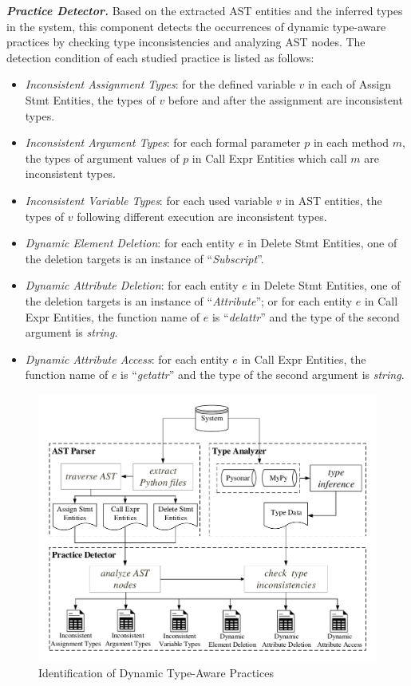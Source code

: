 \noindent\textbf{\emph{Practice Detector.}} Based on the extracted AST entities and the inferred types in the system, this component detects the occurrences of dynamic type-aware practices by checking type inconsistencies and analyzing AST nodes. The detection condition of each studied practice is listed as follows:
\begin{itemize}
	\item 
	\emph{Inconsistent Assignment Types}: for the defined variable $v$ in each of Assign Stmt Entities,  the types of $v$ before and after the assignment are inconsistent types.
	\item 
	\emph{Inconsistent Argument Types}: for each formal parameter $p$ in each method $m$, the types of argument values of $p$  in Call Expr Entities which call $m$ are inconsistent types.
	\item 
	\emph{Inconsistent Variable Types}: for each used variable $v$ in AST entities, the types of $v$ following different execution are inconsistent types.
	\item 
	\emph{Dynamic Element Deletion}: for each entity $e$ in Delete Stmt Entities, one of the deletion targets is an instance of ``\textit{Subscript}''.
	\item 
	\emph{Dynamic Attribute Deletion}: for each entity $e$ in Delete Stmt Entities, one of the deletion targets is an instance of ``\textit{Attribute}''; or for each entity $e$ in Call Expr Entities, the function name of $e$ is ``\textit{delattr}'' and the type of the second argument is \textit{string}.
	\item 
	\emph{Dynamic Attribute Access}: for each entity $e$ in Call Expr Entities, the function name of $e$ is ``\textit{getattr}'' and the type of the second argument is \textit{string}.
\end{itemize}

\begin{figure}
	\centering
	\includegraphics[width=1.0\linewidth]{figures/components.pdf}\vspace{-10pt}
	\caption{Identification of Dynamic Type-Aware Practices}\label{fig:components}
\end{figure}